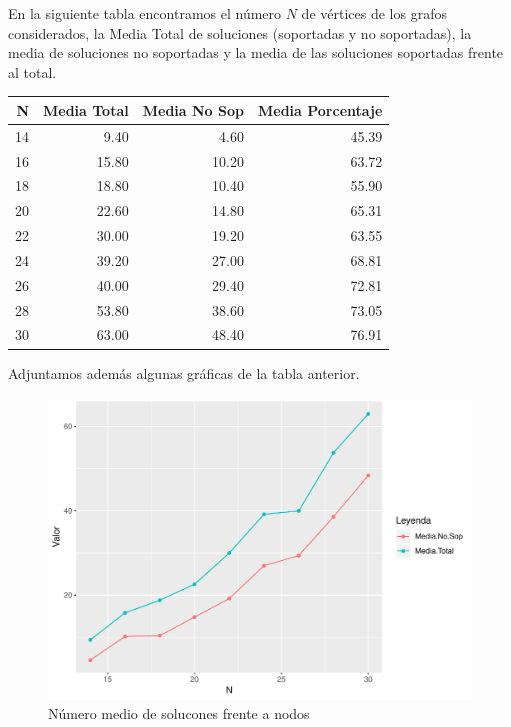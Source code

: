 \documentclass[twoside,a4paper,openright,12pt]{book}
\begin{document}
En la siguiente tabla encontramos el número $N$ de vértices de los grafos considerados, la Media Total de soluciones (soportadas y no soportadas), la media de soluciones no soportadas y la media de las soluciones soportadas frente al total.
\begin{table}[ht]
\centering
\begin{tabular}{rrrr}
  \hline
N & Media Total & Media No Sop & Media Porcentaje \\ 
  \hline
  14 & 9.40 & 4.60 & 45.39 \\ 
  16 & 15.80 & 10.20 & 63.72 \\ 
  18 & 18.80 & 10.40 & 55.90 \\ 
  20 & 22.60 & 14.80 & 65.31 \\ 
  22 & 30.00 & 19.20 & 63.55 \\ 
  24 & 39.20 & 27.00 & 68.81 \\ 
  26 & 40.00 & 29.40 & 72.81 \\ 
  28 & 53.80 & 38.60 & 73.05 \\ 
  30 & 63.00 & 48.40 & 76.91 \\ 
   \hline
\end{tabular}
\end{table}

Adjuntamos además algunas gráficas de la tabla anterior.

\begin{figure}[h!]
\centering
\includegraphics[scale=0.7]{plot10}
\caption{Número medio de solucones frente a nodos}
\end{figure}
\end{document}
